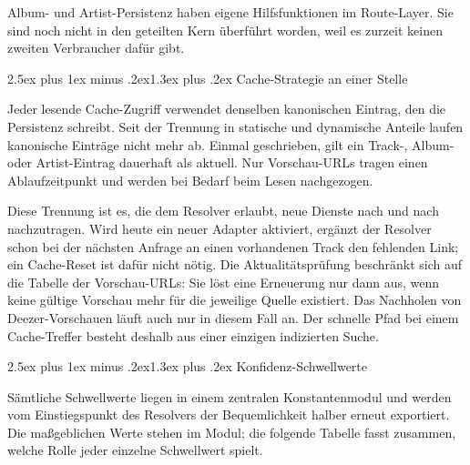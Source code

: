 \documentclass[11pt,a4paper]{article}
\makeatletter
\renewcommand{\section}{\@startsection{section}{1}{0pt}%
  {2.5ex plus 1ex minus .2ex}{1.3ex plus .2ex}%
  {\Large\bfseries\itshape}}
\makeatother
\begin{document}
Album- und Artist-Persistenz haben eigene Hilfsfunktionen im
Route-Layer. Sie sind noch nicht in den geteilten Kern überführt
worden, weil es zurzeit keinen zweiten Verbraucher dafür gibt.

\section{Cache-Strategie an einer Stelle}

Jeder lesende Cache-Zugriff verwendet denselben kanonischen
Eintrag, den die Persistenz schreibt. Seit der Trennung in
statische und dynamische Anteile laufen kanonische Einträge nicht
mehr ab. Einmal geschrieben, gilt ein Track-, Album- oder
Artist-Eintrag dauerhaft als aktuell. Nur Vorschau-URLs tragen
einen Ablaufzeitpunkt und werden bei Bedarf beim Lesen
nachgezogen.

Diese Trennung ist es, die dem Resolver erlaubt, neue Dienste
nach und nach nachzutragen. Wird heute ein neuer Adapter
aktiviert, ergänzt der Resolver schon bei der nächsten Anfrage
an einen vorhandenen Track den fehlenden Link; ein Cache-Reset ist
dafür nicht nötig. Die Aktualitätsprüfung beschränkt sich auf
die Tabelle der Vorschau-URLs: Sie löst eine Erneuerung nur dann
aus, wenn keine gültige Vorschau mehr für die jeweilige Quelle
existiert. Das Nachholen von Deezer-Vorschauen läuft auch nur in
diesem Fall an. Der schnelle Pfad bei einem Cache-Treffer besteht
deshalb aus einer einzigen indizierten Suche.

\section{Konfidenz-Schwellwerte}

Sämtliche Schwellwerte liegen in einem zentralen Konstantenmodul
und werden vom Einstiegspunkt des Resolvers der Bequemlichkeit
halber erneut exportiert. Die maßgeblichen Werte stehen im Modul;
die folgende Tabelle fasst zusammen, welche Rolle jeder einzelne
Schwellwert spielt.
\end{document}
